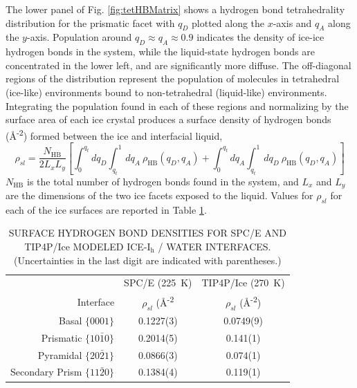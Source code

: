 The lower panel of Fig. \ref{fig:tetHBMatrix} shows a hydrogen bond
tetrahedrality distribution for the prismatic facet with $q_{D}$
plotted along the $x$-axis and $q_{A}$ along the $y$-axis.  Population
around $q_{D} \approx q_{A} \approx 0.9$ indicates the density of
ice-ice hydrogen bonds in the system, while the liquid-state hydrogen
bonds are concentrated in the lower left, and are significantly more
diffuse.  The off-diagonal regions of the distribution represent the
population of molecules in tetrahedral (ice-like) environments bound
to non-tetrahedral (liquid-like) environments. Integrating the
population found in each of these regions and normalizing by the
surface area of each ice crystal produces a surface density of
hydrogen bonds (\AA\textsuperscript{-2}) formed between the ice and
interfacial liquid,
\begin{equation}\label{hbondDensity}
\rho_{sl} = \frac{N_\mathrm{HB}}{2 L_{x}L_{y}} \left[ \int_0^{q_{t}}
  dq_{D} \int_{q_{t}}^1 dq_{A}~\rho_\mathrm{HB}(q_{D},q_{A}) +  \int_0^{q_{t}}
  dq_{A} \int_{q_{t}}^1 dq_{D}~\rho_\mathrm{HB}(q_{D},q_{A}) \right]
\end{equation}
$N_\mathrm{HB}$ is the total number of hydrogen bonds found in the
system, and $L_x$ and $L_y$ are the dimensions of the two ice facets
exposed to the liquid.  Values for $\rho_{sl}$ for each of the ice
surfaces are reported in Table \ref{tab:hbondDens}.

\begin{table}[h]
\centering
\caption{ SURFACE HYDROGEN BOND DENSITIES FOR SPC/E AND
  TIP4P/Ice MODELED ICE-I$_\mathrm{h}$ / WATER INTERFACES.  (Uncertainties in the last digit are indicated with
  parentheses.)\label{tab:hbondDens}} 
\begin{tabular}{|r|c|c|}  
  \toprule
  & \multicolumn{1}{c|}{SPC/E (225~K)} & TIP4P/Ice (270~K) \\
  Interface & $\rho_{sl}$ (\AA\textsuperscript{-2} & $\rho_{sl}$ (\AA\textsuperscript{-2}) \\ 
  \midrule
  Basal  $\{0001\}$                 & 0.1227(3) & 0.0749(9) \\
  Prismatic  $\{10\bar{1}0\}$       & 0.2014(5) &  0.141(1) \\
  Pyramidal  $\{20\bar{2}1\}$       & 0.0866(3) & 0.074(1) \\
  Secondary Prism  $\{11\bar{2}0\}$ & 0.1384(4) & 0.119(1) \\ 
  \bottomrule
\end{tabular}
\end{table}



